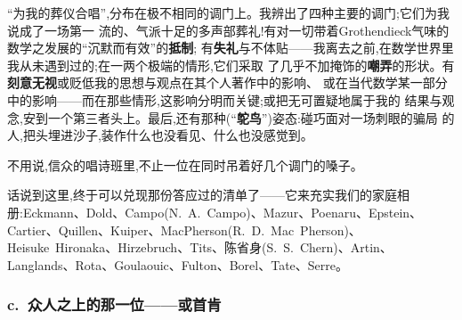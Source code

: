 “为我的葬仪合唱”,分布在极不相同的调门上。我辨出了四种主要的调门;它们为我说成了一场第一
流的、气派十足的多声部葬礼!有对一切带着Grothendieck气味的数学之发展的“沉默而有效”的\textbf{抵制};
有\textbf{失礼}与不体贴——我\dmark{}离去之前,在数学世界里我从未遇到过的;在一两个极端的情形,它们采取
了几乎不加掩饰的\textbf{嘲弄}的形状。有\textbf{刻意无视}或贬低我的思想与观点在其个人著作中的影响、
或在当代数学某一部分中的影响——而在那些情形,这影响分明而关键;或把无可置疑地属于我的
结果与观念,安到一个第三者头上。最后,还有那种(“\textbf{鸵鸟}”)姿态:碰巧面对一场刺眼的骗局
的人,把头埋进沙子,装作什么也没看见、什么也没感觉到。

不用说,信众的唱诗班里,不止一位在同时吊着好几个调门的嗓子。

话说到这里,终于可以兑现那份答应过的清单了——它来充实我们的家庭相册:Eckmann、Dold、Campo(N.~A.~Campo)、Mazur、Poenaru、Epstein、Cartier、Quillen、Kuiper、MacPherson(R.~D.~Mac~Pherson)、Heisuke~Hironaka、Hirzebruch、Tits、陈省身(S.~S.~Chern)、Artin、Langlands、Rota、Goulaouic、Fulton、Borel、Tate、Serre。

\subsubsection*{c.\ 众人之上的那一位——或首肯}

